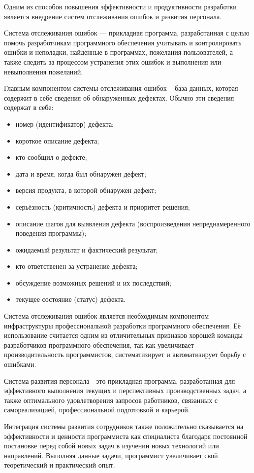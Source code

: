 Одним из способов повышения эффективности и продуктивности разработки является внедрение систем отслеживания ошибок и развития персонала.

Система отслеживания ошибок — прикладная программа, разработанная с целью помочь разработчикам программного обеспечения учитывать и контролировать ошибки и неполадки, найденные в программах, пожелания пользователей, а также следить за процессом устранения этих ошибок и выполнения или невыполнения пожеланий.

Главным компонентом системы отслеживания ошибок – база данных, которая содержит в себе сведения об обнаруженных дефектах. Обычно эти сведения содержат в себе:
\begin{itemize}
    \item номер (идентификатор) дефекта;
    \item короткое описание дефекта;
    \item кто сообщил о дефекте;
    \item дата и время, когда был обнаружен дефект;
    \item версия продукта, в которой обнаружен дефект;
    \item серьёзность (критичность) дефекта и приоритет решения;
    \item описание шагов для выявления дефекта (воспроизведения непреднамеренного поведения программы);
    \item ожидаемый результат и фактический результат;
    \item кто ответственен за устранение дефекта;
    \item обсуждение возможных решений и их последствий;
    \item текущее состояние (статус) дефекта.
\end{itemize}

Система отслеживания ошибок является необходимым компонентом инфраструктуры профессиональной разработки программного обеспечения. Её использование считается одним из отличительных признаков хорошей команды разработчиков программного обеспечения, так как увеличивает производительность программистов, систематизирует и автоматизирует борьбу с ошибками.

Система развития персонала - это прикладная программа, разработанная для эффективного выполнения текущих и перспективных производственных задач, а также оптимального удовлетворения запросов работников, связанных с самореализацией, профессиональной подготовкой и карьерой. 

Интеграция системы развития сотрудников также положительно сказывается на эффективности и ценности программиста как специалиста благодаря постоянной постановке перед собой новых задач в изучении новых технологий или направлений. Выполняя данные задачи, программист увеличивает свой теоретический и практический опыт.

